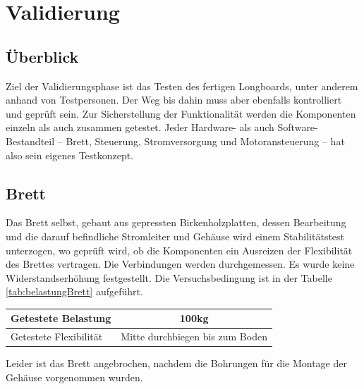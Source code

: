\chapter{Validierung} \label{Validierung}


\section{Überblick} \label{ValidUeberblick}
Ziel der Validierungsphase ist das Testen des fertigen Longboards, unter anderem anhand von Testpersonen. Der Weg bis dahin muss aber ebenfalls kontrolliert und geprüft sein. Zur Sicherstellung der Funktionalität werden die Komponenten einzeln als auch zusammen getestet. 
Jeder Hardware- als auch Software-Bestandteil – Brett, Steuerung, Stromversorgung und Motoransteuerung – hat also sein eigenes Testkonzept.

\section{Brett} \label{ValidBrett}
Das Brett selbst, gebaut aus gepressten Birkenholzplatten, dessen Bearbeitung und die darauf befindliche Stromleiter und Gehäuse wird einem Stabilitätstest unterzogen, wo geprüft wird, ob die Komponenten ein Ausreizen der Flexibilität des Brettes vertragen. Die Verbindungen werden durchgemessen. Es wurde keine Widerstandserhöhung festgestellt. Die Versuchsbedingung ist in der Tabelle \ref{tab:belastungBrett} aufgeführt.
\begin{center}
	\begin{tabular}{l|c}
		\hline 
		Getestete Belastung & 100kg \\ \hline
		Getestete Flexibilität & Mitte durchbiegen bis zum Boden \\ \hline
	\end{tabular} 
	\label{tab:belastungBrett}
\end{center}
Leider ist das Brett angebrochen, nachdem die Bohrungen für die Montage der Gehäuse vorgenommen wurden.
